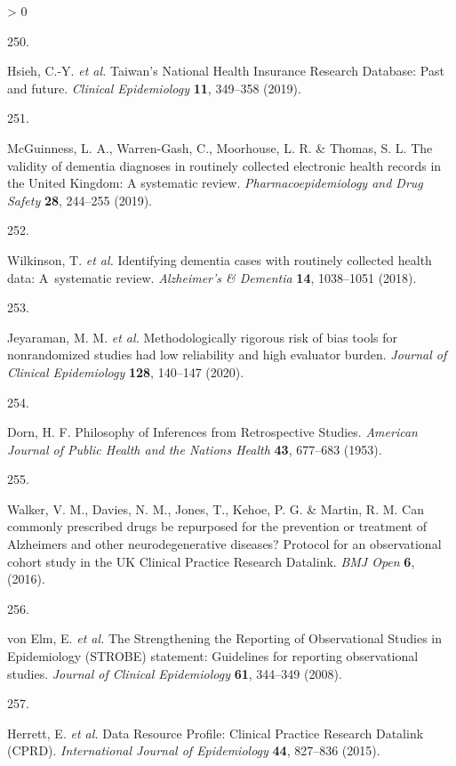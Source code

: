\documentclass[a4paper, twoside]{templates/ociamthesis}
\newlength{\cslhangindent}
\newlength{\csllabelwidth}
\newenvironment{CSLReferences}[3] %
 {%
  \setlength{\parindent}{0pt}
  \ifodd #1 \everypar{\setlength{\hangindent}{\cslhangindent}}\ignorespaces\fi
  \ifnum #2 > 0
  \setlength{\parskip}{#2\baselineskip}
  \fi
 }%
 {}
\newcommand{\CSLLeftMargin}[1]{\parbox[t]{\maxof{\widthof{#1}}{\csllabelwidth}}{#1}}
\newcommand{\CSLRightInline}[1]{\parbox[t]{\linewidth - \csllabelwidth}{#1}}
\begin{document}
\begin{CSLReferences}{0}{0}
\leavevmode\hypertarget{ref-hsieh2019}{}%
\CSLLeftMargin{250. }
\CSLRightInline{Hsieh, C.-Y. \emph{et al.} Taiwan's {National Health Insurance Research Database}: Past and future. \emph{Clinical Epidemiology} \textbf{11}, 349--358 (2019).}

\leavevmode\hypertarget{ref-mcguinness2019validity}{}%
\CSLLeftMargin{251. }
\CSLRightInline{McGuinness, L. A., Warren-Gash, C., Moorhouse, L. R. \& Thomas, S. L. The validity of dementia diagnoses in routinely collected electronic health records in the {United Kingdom}: {A} systematic review. \emph{Pharmacoepidemiology and Drug Safety} \textbf{28}, 244--255 (2019).}

\leavevmode\hypertarget{ref-wilkinson2018}{}%
\CSLLeftMargin{252. }
\CSLRightInline{Wilkinson, T. \emph{et al.} Identifying dementia cases with routinely collected health data: {A}~systematic review. \emph{Alzheimer's \& Dementia} \textbf{14}, 1038--1051 (2018).}

\leavevmode\hypertarget{ref-jeyaraman2020}{}%
\CSLLeftMargin{253. }
\CSLRightInline{Jeyaraman, M. M. \emph{et al.} Methodologically rigorous risk of bias tools for nonrandomized studies had low reliability and high evaluator burden. \emph{Journal of Clinical Epidemiology} \textbf{128}, 140--147 (2020).}

\leavevmode\hypertarget{ref-dorn1953}{}%
\CSLLeftMargin{254. }
\CSLRightInline{Dorn, H. F. Philosophy of {Inferences} from {Retrospective Studies}. \emph{American Journal of Public Health and the Nations Health} \textbf{43}, 677--683 (1953).}

\leavevmode\hypertarget{ref-walker2016}{}%
\CSLLeftMargin{255. }
\CSLRightInline{Walker, V. M., Davies, N. M., Jones, T., Kehoe, P. G. \& Martin, R. M. Can commonly prescribed drugs be repurposed for the prevention or treatment of {Alzheimers} and other neurodegenerative diseases? {Protocol} for an observational cohort study in the {UK Clinical Practice Research Datalink}. \emph{BMJ Open} \textbf{6}, (2016).}

\leavevmode\hypertarget{ref-vonelm2008}{}%
\CSLLeftMargin{256. }
\CSLRightInline{von Elm, E. \emph{et al.} The {Strengthening} the {Reporting} of {Observational Studies} in {Epidemiology} ({STROBE}) statement: Guidelines for reporting observational studies. \emph{Journal of Clinical Epidemiology} \textbf{61}, 344--349 (2008).}

\leavevmode\hypertarget{ref-herrett2015}{}%
\CSLLeftMargin{257. }
\CSLRightInline{Herrett, E. \emph{et al.} Data {Resource Profile}: {Clinical Practice Research Datalink} ({CPRD}). \emph{International Journal of Epidemiology} \textbf{44}, 827--836 (2015).}


\end{CSLReferences}
\end{document}
